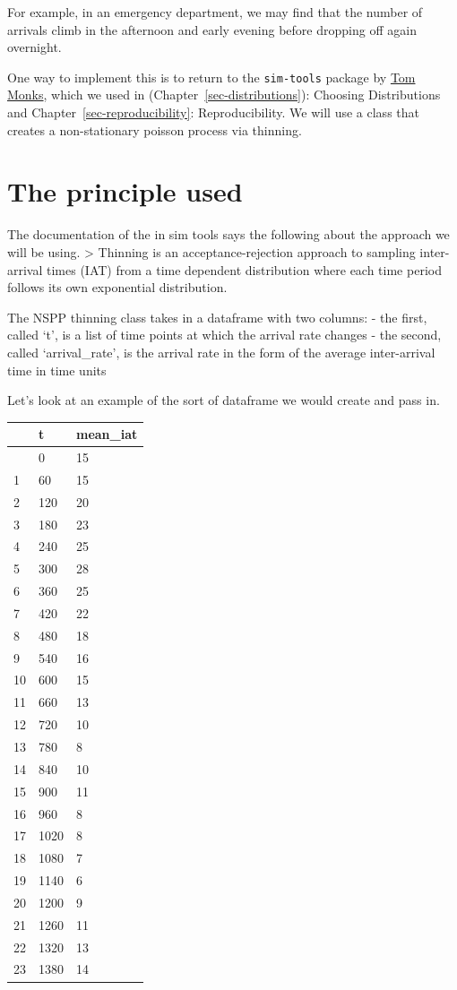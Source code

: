 \documentclass[
  letterpaper,
  DIV=11,
  numbers=noendperiod]{scrreprt}
\begin{document}
For example, in an emergency department, we may find that the number of
arrivals climb in the afternoon and early evening before dropping off
again overnight.

One way to implement this is to return to the \texttt{sim-tools} package
by \href{https://orcid.org/0000-0003-2631-4481}{Tom Monks}, which we
used in (Chapter~\ref{sec-distributions}): Choosing Distributions and
Chapter~\ref{sec-reproducibility}: Reproducibility. We will use a class
that creates a non-stationary poisson process via thinning.

\section{The principle used}\label{the-principle-used}

The documentation of the in sim tools says the following about the
approach we will be using. \textgreater{} Thinning is an
acceptance-rejection approach to sampling inter-arrival times (IAT) from
a time dependent distribution where each time period follows its own
exponential distribution.

The NSPP thinning class takes in a dataframe with two columns: - the
first, called `t', is a list of time points at which the arrival rate
changes - the second, called `arrival\_rate', is the arrival rate in the
form of the average inter-arrival time in time units

Let's look at an example of the sort of dataframe we would create and
pass in.

\begin{longtable}[]{@{}lll@{}}
\toprule\noalign{}
& t & mean\_iat \\
\midrule\noalign{}
\endhead
\bottomrule\noalign{}
\endlastfoot
0 & 0 & 15 \\
1 & 60 & 15 \\
2 & 120 & 20 \\
3 & 180 & 23 \\
4 & 240 & 25 \\
5 & 300 & 28 \\
6 & 360 & 25 \\
7 & 420 & 22 \\
8 & 480 & 18 \\
9 & 540 & 16 \\
10 & 600 & 15 \\
11 & 660 & 13 \\
12 & 720 & 10 \\
13 & 780 & 8 \\
14 & 840 & 10 \\
15 & 900 & 11 \\
16 & 960 & 8 \\
17 & 1020 & 8 \\
18 & 1080 & 7 \\
19 & 1140 & 6 \\
20 & 1200 & 9 \\
21 & 1260 & 11 \\
22 & 1320 & 13 \\
23 & 1380 & 14 \\
\end{longtable}
\end{document}
